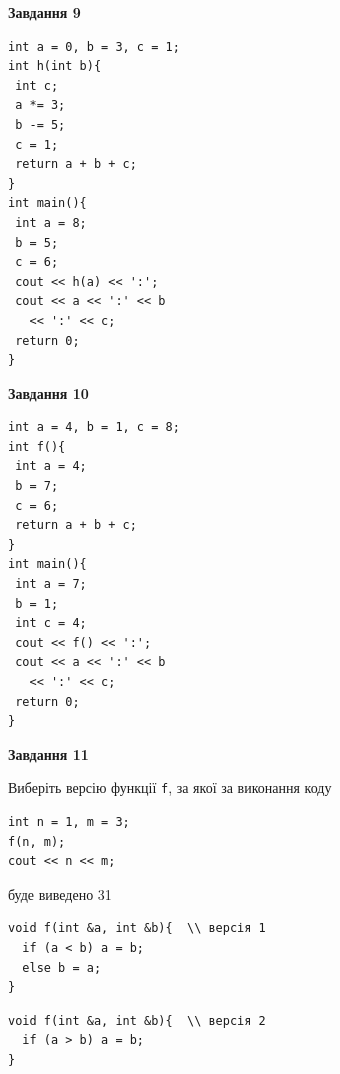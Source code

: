 \documentclass[12pt, ukrainian]{article}
\def\code#1{\Verb!#1!}
\begin{document}
{\begin {large}
\begin{minipage}[t]{11.0cm}
\end{minipage}


\begin{minipage}[t]{7.0cm}

\begin{center}
\textbf{Завдання 9}
\end{center}
\vspace{-8mm}

\begin{verbatim}
int a = 0, b = 3, c = 1;
int h(int b){
 int c;
 a *= 3;
 b -= 5;
 c = 1;
 return a + b + c;
}
int main(){
 int a = 8;
 b = 5;
 c = 6;
 cout << h(a) << ':';
 cout << a << ':' << b 
   << ':' << c;
 return 0;
}
\end{verbatim}



\begin{center}
\textbf{Завдання 10}
\end{center}
\vspace{-8mm}

\begin{verbatim}
int a = 4, b = 1, c = 8;
int f(){
 int a = 4;
 b = 7;
 c = 6;
 return a + b + c;
}
int main(){
 int a = 7;
 b = 1;
 int c = 4;
 cout << f() << ':';
 cout << a << ':' << b 
   << ':' << c;
 return 0;
}
\end{verbatim}

\end{minipage}
\vline \hspace{1mm}
\begin{minipage}[t]{11.0cm}

\begin{center}
\textbf{Завдання 11}
\end{center}
Виберіть версію функції \code{f}, за якої за виконання коду
\begin{verbatim}
int n = 1, m = 3;
f(n, m);
cout << n << m;
\end{verbatim}

буде виведено 31

\begin{verbatim}
void f(int &a, int &b){  \\ версія 1
  if (a < b) a = b;
  else b = a;
}
\end{verbatim}

\vspace{-8mm}\begin{verbatim}
void f(int &a, int &b){  \\ версія 2
  if (a > b) a = b;
}
\end{verbatim}


\end{minipage}
\end{large}}
\end{document}
